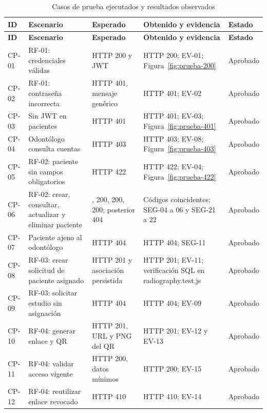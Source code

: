 \begingroup
\footnotesize
\setlength{\tabcolsep}{3pt}
\renewcommand{\arraystretch}{1.2}
\begin{longtable}{@{}>{\raggedright\arraybackslash}p{.09\linewidth}>{\raggedright\arraybackslash}p{.24\linewidth}>{\raggedright\arraybackslash}p{.21\linewidth}>{\raggedright\arraybackslash}p{.27\linewidth}>{\raggedright\arraybackslash}p{.11\linewidth}@{}}
\caption{Casos de prueba ejecutados y resultados observados}\label{tab:pruebas-reales}\\
\toprule
\textbf{ID}&\textbf{Escenario}&\textbf{Esperado}&\textbf{Obtenido y evidencia}&\textbf{Estado}\\\midrule
\endfirsthead
\toprule
\textbf{ID}&\textbf{Escenario}&\textbf{Esperado}&\textbf{Obtenido y evidencia}&\textbf{Estado}\\\midrule
\endhead
\bottomrule\endlastfoot
CP-01 & RF-01: credenciales válidas & HTTP 200 y JWT & HTTP 200; EV-01; Figura~\ref{fig:prueba-200} & Aprobado \\
CP-02 & RF-01: contraseña incorrecta & HTTP 401, mensaje genérico & HTTP 401; EV-02 & Aprobado \\
CP-03 & Sin JWT en pacientes & HTTP 401 & HTTP 401; EV-03; Figura~\ref{fig:prueba-401} & Aprobado \\
CP-04 & Odontólogo consulta cuentas & HTTP 403 & HTTP 403; EV-08; Figura~\ref{fig:prueba-403} & Aprobado \\
CP-05 & RF-02: paciente sin campos obligatorios & HTTP 422 & HTTP 422; EV-04; Figura~\ref{fig:prueba-422} & Aprobado \\
CP-06 & RF-02: crear, consultar, actualizar y eliminar paciente & 201, 200, 200, 200; posterior 404 & Códigos coincidentes; SEG-04 a 06 y SEG-21 a 22 & Aprobado \\
CP-07 & Paciente ajeno al odontólogo & HTTP 404 & HTTP 404; SEG-11 & Aprobado \\
CP-08 & RF-03: crear solicitud de paciente asignado & HTTP 201 y asociación persistida & HTTP 201; EV-11; verificación SQL en radiography.test.js & Aprobado \\
CP-09 & RF-03: solicitar estudio sin asignación & HTTP 404 & HTTP 404; EV-09 & Aprobado \\
CP-10 & RF-04: generar enlace y QR & HTTP 201, URL y PNG del QR & HTTP 201; EV-12 y EV-13 & Aprobado \\
CP-11 & RF-04: validar acceso vigente & HTTP 200, datos mínimos & HTTP 200; EV-15 & Aprobado \\
CP-12 & RF-04: reutilizar enlace revocado & HTTP 410 & HTTP 410; EV-14 & Aprobado \\

\end{longtable}
